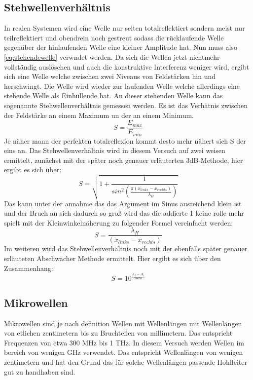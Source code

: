 \subsection{Stehwellenverhältnis}
\label{sec:thstehwelle}
In realen Systemen wird eine Welle nur selten totalreflektiert sondern meist nur teilreflektiert
und obendrein noch gestreut sodass die rücklaufende Welle gegenüber der hinlaufenden Welle eine
kleiner Amplitude hat. Nun muss also \autoref{eq:stehendewelle} verwndet werden. Da sich die Wellen 
jetzt nichtmehr vollständig auslöschen und auch die konstruktive Interferenz weniger wird, ergibt 
sich eine Welle welche zwischen zwei Niveaus von Feldstärken hin und herschwingt. Die Welle 
wird wieder zur laufenden Welle welche allerdings eine stehende Welle als Einhüllende hat.
An dieser stehenden Welle kann das sogenannte Stehwellenverhältnis gemessen werden. Es ist das 
Verhätnis zwischen der Feldstärke an einem Maximum un der an einem Minimum.
\begin{equation}
    \label{eq:stehwellenverhaeltnis}
    S=\frac{E_{max}}{E_{min}}
\end{equation}
Je näher mann der perfekten totalreflexion kommt desto mehr nähert sich S der eins an.
Das Stehwellenverhältnis wird in diesem Versuch auf zwei weisen ermittelt, zunächst mit der
später noch genauer erläuterten 3dB-Methode, hier ergibt es sich über:
\begin{equation}
    \label{eq:dreidB}
    S=\sqrt{1+\frac{1}{sin^2(\frac{\pi (x_{links}-x_{rechts})}{\lambda_H})}}
\end{equation}
Das kann unter der annahme das das Argument im Sinus ausreichend klein ist und der Bruch an sich 
dadurch so groß wird das die addierte 1 keine rolle mehr spielt mit der Kleinwinkelnäherung zu folgender
Formel vereinfacht werden:
\begin{equation}
    \label{eq:3dBleicht}
    S=\frac{\lambda_H}{(x_{links}-x_{rechts})}
\end{equation}
Im weiteren wird das Stehwellenverhältnis noch mit der ebenfalls später genauer erläuteten Abschwächer 
Methode ermittelt. Hier ergibt es sich über den Zusammenhang:
\begin{equation}
    S=10^{\frac{A_2-A_1}{20dB}}
\end{equation}

\subsection{Mikrowellen}
\label{sec:thallgemein}
Mikrowellen sind je nach definition Wellen mit Wellenlängen mit Wellenlängen von etlichen zentimetern bis
zu Bruchteilen von millimetern. Das entspricht Frequenzen von etwa 300 MHz bis 1 THz. In diesem Versuch werden
Wellen im bereich von wenigen GHz verwendet. Das entspricht Wellenlängen von wenigen zentimetern und hat den
Grund das für solche Wellenlängen passende Hohlleiter gut zu handhaben sind.

